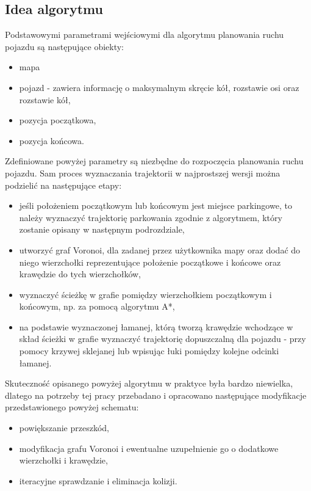 \documentclass[a4paper,11pt,twoside]{report}
\theoremstyle{definition}
\begin{document}
\subsection{Idea algorytmu}

Podstawowymi parametrami wejściowymi dla algorytmu planowania ruchu pojazdu są następujące obiekty:
\begin{itemize}
	\item mapa
	\item pojazd - zawiera informację o maksymalnym skręcie kół, rozstawie osi oraz rozstawie kół,
	\item pozycja początkowa,
	\item pozycja końcowa.
\end{itemize}

Zdefiniowane powyżej parametry są niezbędne do rozpoczęcia planowania ruchu pojazdu. Sam proces wyznaczania trajektorii w najprostszej wersji można podzielić na następujące etapy:
\begin{itemize}
	\item jeśli położeniem początkowym lub końcowym jest miejsce parkingowe, to należy wyznaczyć trajektorię parkowania zgodnie z algorytmem, który zostanie opisany w następnym podrozdziale,
	\item utworzyć graf Voronoi, dla zadanej przez użytkownika mapy oraz dodać do niego wierzchołki reprezentujące położenie początkowe i końcowe oraz krawędzie do tych wierzchołków,
	\item wyznaczyć ścieżkę w grafie pomiędzy wierzchołkiem początkowym i końcowym, np. za pomocą algorytmu A*,
	\item na podstawie wyznaczonej łamanej, którą tworzą krawędzie wchodzące w skład ścieżki w grafie wyznaczyć trajektorię dopuszczalną dla pojazdu - przy pomocy krzywej sklejanej lub wpisując łuki pomiędzy kolejne odcinki łamanej.
\end{itemize}

Skuteczność opisanego powyżej algorytmu w praktyce była bardzo niewielka, dlatego na potrzeby tej pracy przebadano i opracowano następujące modyfikacje przedstawionego powyżej schematu:
\begin{itemize}
	\item powiększanie przeszkód,
	\item modyfikacja grafu Voronoi i ewentualne uzupełnienie go o dodatkowe wierzchołki i krawędzie,
	\item iteracyjne sprawdzanie i eliminacja kolizji.
\end{itemize}
\end{document}
